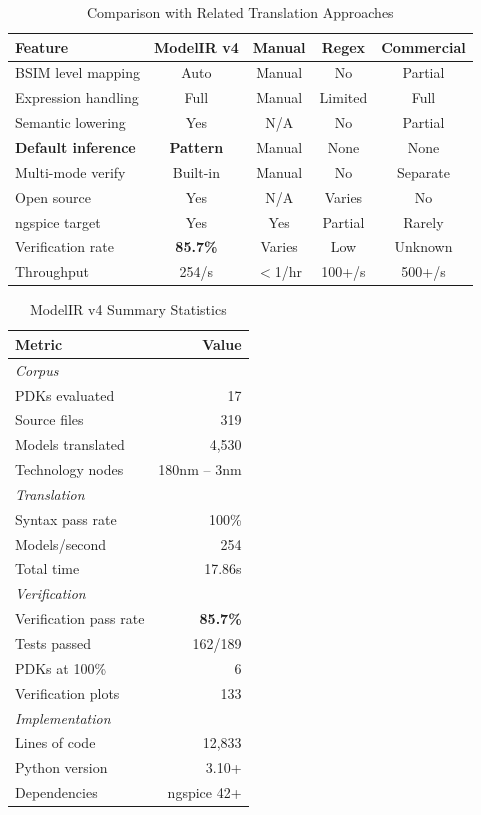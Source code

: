 \documentclass[10pt,twocolumn]{article}
\begin{document}
\begin{table}[!t]
\caption{Comparison with Related Translation Approaches}
\label{tab:comparison_appendix}
\centering
\renewcommand{\arraystretch}{1.15}
\begin{tabular}{@{}lcccc@{}}
\toprule
\textbf{Feature} & \textbf{ModelIR v4} & \textbf{Manual} & \textbf{Regex} & \textbf{Commercial} \\
\midrule
BSIM level mapping & Auto & Manual & No & Partial \\
Expression handling & Full & Manual & Limited & Full \\
Semantic lowering & Yes & N/A & No & Partial \\
\textbf{Default inference} & \textbf{Pattern} & Manual & None & None \\
Multi-mode verify & Built-in & Manual & No & Separate \\
Open source & Yes & N/A & Varies & No \\
ngspice target & Yes & Yes & Partial & Rarely \\
Verification rate & \textbf{85.7\%} & Varies & Low & Unknown \\
Throughput & 254/s & $<$1/hr & 100+/s & 500+/s \\
\bottomrule
\end{tabular}
\end{table}

\begin{table}[!t]
\caption{ModelIR v4 Summary Statistics}
\label{tab:summary_appendix}
\centering
\renewcommand{\arraystretch}{1.15}
\begin{tabular}{@{}lr@{}}
\toprule
\textbf{Metric} & \textbf{Value} \\
\midrule
\multicolumn{2}{l}{\textit{Corpus}} \\
PDKs evaluated & 17 \\
Source files & 319 \\
Models translated & 4,530 \\
Technology nodes & 180nm -- 3nm \\
\midrule
\multicolumn{2}{l}{\textit{Translation}} \\
Syntax pass rate & 100\% \\
Models/second & 254 \\
Total time & 17.86s \\
\midrule
\multicolumn{2}{l}{\textit{Verification}} \\
Verification pass rate & \textbf{85.7\%} \\
Tests passed & 162/189 \\
PDKs at 100\% & 6 \\
Verification plots & 133 \\
\midrule
\multicolumn{2}{l}{\textit{Implementation}} \\
Lines of code & 12,833 \\
Python version & 3.10+ \\
Dependencies & ngspice 42+ \\
\bottomrule
\end{tabular}
\end{table}
\end{document}
